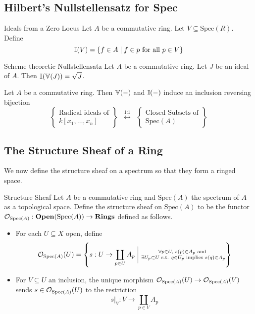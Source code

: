 \documentclass[a4paper]{article}
\begin{document}
\subsection{Hilbert's Nullstellensatz for Spec}
\begin{defn}{Ideals from a Zero Locus}{} Let $A$ be a commutative ring. Let $V\subseteq\text{Spec}(R)$. Define $$\mathbb{I}(V)=\{f\in A\;|\;f\in p\text{ for all }p\in V\}$$
\end{defn}

\begin{thm}{Scheme-theoretic Nullstellensatz}{} Let $A$ be a commutative ring. Let $J$ be an ideal of $A$. Then $\mathbb{I}(\mathbb{V}(J))=\sqrt{J}$. 
\end{thm}

\begin{crl}{}{} Let $A$ be a commutative ring. Then $\mathbb{V}(-)$ and $\mathbb{I}(-)$ induce an inclusion reversing bijection $$\left\{\substack{\text{Radical ideals of}\\ k[x_1,\dots,x_n]}\right\}\;\;\overset{\text{1:1}}{\longleftrightarrow}\;\;\left\{\substack{\text{Closed Subsets of}\\\text{Spec}(A)}\right\}$$
\end{crl}

\subsection{The Structure Sheaf of a Ring}
We now define the structure sheaf on a spectrum so that they form a ringed space. 

\begin{defn}{Structure Sheaf}{} Let $A$ be a commutative ring and $\text{Spec}(A)$ the spectrum of $A$ as a topological space. Define the structure sheaf on $\text{Spec}(A)$ to be the functor $\mathcal{O}_{\text{Spec}(A)}:\bold{Open}(\text{Spec}(A))\to\bold{Rings}$ defined as follows. 
\begin{itemize}
\item For each $U\subseteq X$ open, define $$\mathcal{O}_{\text{Spec}(A)}(U)=\left\{s:U\to\coprod_{p\in U}A_p\;\bigg{|}\;\substack{\forall p\in U,\;s(p)\in A_p\text{ and }\\\exists U_p\subset U\text{ s.t. }q\in U_p\text{ implies }s(q)\in A_p}\right\}$$
\item For $V\subseteq U$ an inclusion, the unique morphism $\mathcal{O}_{\text{Spec}(A)}(U)\to\mathcal{O}_{\text{Spec}(A)}(V)$ sends $s\in\mathcal{O}_{\text{Spec}(A)}(U)$ to the restriction $$s|_V:V\to\coprod_{p\in V}A_p$$
\end{itemize}
\end{defn}
\end{document}
